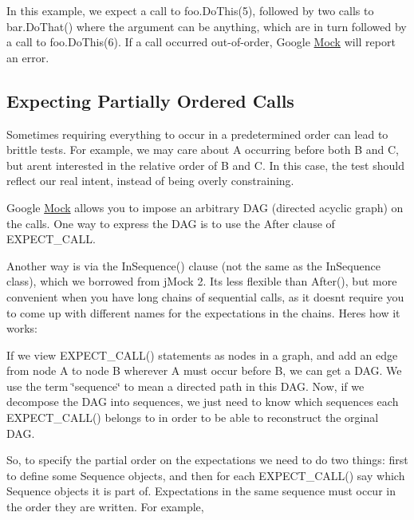 In this example, we expect a call to {\ttfamily foo.\+Do\+This(5)}, followed by two calls to {\ttfamily bar.\+Do\+That()} where the argument can be anything, which are in turn followed by a call to {\ttfamily foo.\+Do\+This(6)}. If a call occurred out-\/of-\/order, Google \mbox{\hyperlink{class_mock}{Mock}} will report an error.

\subsection*{Expecting Partially Ordered Calls}

Sometimes requiring everything to occur in a predetermined order can lead to brittle tests. For example, we may care about {\ttfamily A} occurring before both {\ttfamily B} and {\ttfamily C}, but aren\textquotesingle{}t interested in the relative order of {\ttfamily B} and {\ttfamily C}. In this case, the test should reflect our real intent, instead of being overly constraining.

Google \mbox{\hyperlink{class_mock}{Mock}} allows you to impose an arbitrary D\+AG (directed acyclic graph) on the calls. One way to express the D\+AG is to use the After clause of {\ttfamily E\+X\+P\+E\+C\+T\+\_\+\+C\+A\+LL}.

Another way is via the {\ttfamily In\+Sequence()} clause (not the same as the {\ttfamily In\+Sequence} class), which we borrowed from j\+Mock 2. It\textquotesingle{}s less flexible than {\ttfamily After()}, but more convenient when you have long chains of sequential calls, as it doesn\textquotesingle{}t require you to come up with different names for the expectations in the chains. Here\textquotesingle{}s how it works\+:

If we view {\ttfamily E\+X\+P\+E\+C\+T\+\_\+\+C\+A\+L\+L()} statements as nodes in a graph, and add an edge from node A to node B wherever A must occur before B, we can get a D\+AG. We use the term \char`\"{}sequence\char`\"{} to mean a directed path in this D\+AG. Now, if we decompose the D\+AG into sequences, we just need to know which sequences each {\ttfamily E\+X\+P\+E\+C\+T\+\_\+\+C\+A\+L\+L()} belongs to in order to be able to reconstruct the orginal D\+AG.

So, to specify the partial order on the expectations we need to do two things\+: first to define some {\ttfamily Sequence} objects, and then for each {\ttfamily E\+X\+P\+E\+C\+T\+\_\+\+C\+A\+L\+L()} say which {\ttfamily Sequence} objects it is part of. Expectations in the same sequence must occur in the order they are written. For example,


